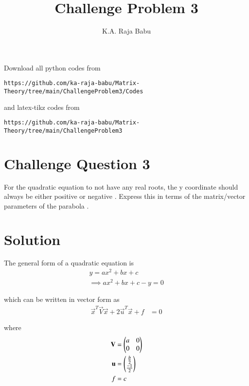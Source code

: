 \documentclass[journal,12pt,twocolumn]{IEEEtran}
\begin{document}
     \def\rightbox#1{\makebox[0in][r]{#1}}
     \def\centbox#1{\makebox[0in]{#1}}
     \def\topbox#1{\raisebox{-\baselineskip}[0in][0in]{#1}}
     \def\midbox#1{\raisebox{-0.5\baselineskip}[0in][0in]{#1}}
\vspace{3cm}
\title{Challenge Problem 3}
\author{K.A. Raja Babu}
\maketitle
\newpage
\bigskip
\renewcommand{\thefigure}{\theenumi}
\renewcommand{\thetable}{\theenumi}
Download all python codes from 
\begin{lstlisting}
https://github.com/ka-raja-babu/Matrix-Theory/tree/main/ChallengeProblem3/Codes
\end{lstlisting}
%
and latex-tikz codes from 
%
\begin{lstlisting}
https://github.com/ka-raja-babu/Matrix-Theory/tree/main/ChallengeProblem3
\end{lstlisting}
%
\section{Challenge Question 3}

For the quadratic equation to not have any real roots, the y coordinate should always be either positive or negative . Express this in terms of the matrix/vector parameters of the parabola .

\section{Solution}

The general form of a quadratic equation is 
\begin{align}
    y = ax^2+bx+c \\
    \implies ax^2+bx+c-y = 0
\end{align}

which can be written in vector form as
\begin{align}
    \vec{x}^T\vec{V}\vec{x} + 2\vec{u}^T\vec{x} + f &= 0
\end{align}

where
\begin{align}
    \mathbf{V} &= \begin{pmatrix}a & 0 \\ 0 & 0\end{pmatrix}
    \\
    \mathbf{u} &= \begin{pmatrix}\frac{b}{2} \\ \frac{-1}{2}\end{pmatrix}
    \\
    f &= c
\end{align}
\end{document}

